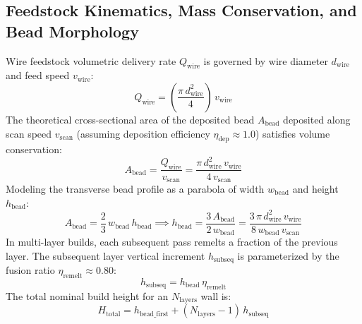 \documentclass[10pt,a4paper]{article}
\begin{document}
\subsection{Feedstock Kinematics, Mass Conservation, and Bead Morphology}
Wire feedstock volumetric delivery rate $Q_{\mathrm{wire}}$ is governed by wire diameter $d_{\mathrm{wire}}$ and feed speed $v_{\mathrm{wire}}$:
\begin{equation}
Q_{\mathrm{wire}} = \left(\frac{\pi\,d_{\mathrm{wire}}^2}{4}\right)\,v_{\mathrm{wire}}
\end{equation}
The theoretical cross-sectional area of the deposited bead $A_{\mathrm{bead}}$ deposited along scan speed $v_{\mathrm{scan}}$ (assuming deposition efficiency $\eta_{\mathrm{dep}} \approx 1.0$) satisfies volume conservation:
\begin{equation}
A_{\mathrm{bead}} = \frac{Q_{\mathrm{wire}}}{v_{\mathrm{scan}}} = \frac{\pi\,d_{\mathrm{wire}}^2\,v_{\mathrm{wire}}}{4\,v_{\mathrm{scan}}}
\end{equation}
Modeling the transverse bead profile as a parabola of width $w_{\mathrm{bead}}$ and height $h_{\mathrm{bead}}$:
\begin{equation}
A_{\mathrm{bead}} = \frac{2}{3}\,w_{\mathrm{bead}}\,h_{\mathrm{bead}} \implies h_{\mathrm{bead}} = \frac{3\,A_{\mathrm{bead}}}{2\,w_{\mathrm{bead}}} = \frac{3\,\pi\,d_{\mathrm{wire}}^2\,v_{\mathrm{wire}}}{8\,w_{\mathrm{bead}}\,v_{\mathrm{scan}}}
\end{equation}
In multi-layer builds, each subsequent pass remelts a fraction of the previous layer. The subsequent layer vertical increment $h_{\mathrm{subseq}}$ is parameterized by the fusion ratio $\eta_{\mathrm{remelt}} \approx 0.80$:
\begin{equation}
h_{\mathrm{subseq}} = h_{\mathrm{bead}}\,\eta_{\mathrm{remelt}}
\end{equation}
The total nominal build height for an $N_{\mathrm{layers}}$ wall is:
\begin{equation}
H_{\mathrm{total}} = h_{\mathrm{bead\_first}} + (N_{\mathrm{layers}} - 1)\,h_{\mathrm{subseq}}
\end{equation}
\end{document}
